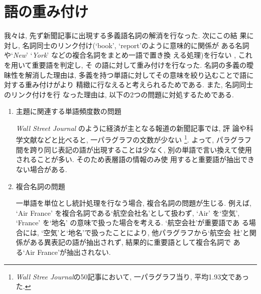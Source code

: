 \section{語の重み付け}


我々は, 先ず新聞記事に出現する多義語名詞の解消を行なった.  次にこの結
果に対し, 名詞同士のリンク付け(`book', `report'のように意味的に関係が
ある名詞や`{\it New}' `{\it York}' などの複合名詞をまとめ一語で置き換
える処理)を行ない \cite{Fukumoto1996}, これを用いて重要語を判定し, そ
の語に対して重み付けを行なった.  名詞の多義の曖昧性を解消した理由は, 
多義を持つ単語に対してその意味を絞り込むことで語に対する重み付けがより
精緻に行なえると考えられるためである.  また, 名詞同士のリンク付けを行
なった理由は, 以下の2つの問題に対処するためである.

\begin{enumerate}

\item 主題に関連する単語頻度数の問題

{\it Wall Street Journal} のように経済が主となる報道の新聞記事では, 評
論や科学文献などと比べると, 一パラグラフの文数が少ない \footnote{{\it
Wall Stree Journal}の50記事において, 一パラグラフ当り, 平均1.93文であっ
た.}.  よって, パラグラフ間を跨り同じ表記の語が出現することは少なく, 
別の単語で言い換えて使用されることが多い.  そのため表層語の情報のみ使
用すると重要語が抽出できない場合がある.


\item 複合名詞の問題

一単語を単位とし統計処理を行なう場合, 複合名詞の問題が生じる.  例えば,
`Air France' を複合名詞である`航空会社名'として扱わず, `Air' を`空気',
`France' を`地名' の意味で扱った場合を考える.  `航空会社'が重要語であ
る場合には, `空気'と`地名'で扱ったことにより, 他パラグラフから`航空会
社'と関係がある異表記の語が抽出されず, 結果的に重要語として複合名詞で
ある`Air France'が抽出されない.

\end{enumerate}

